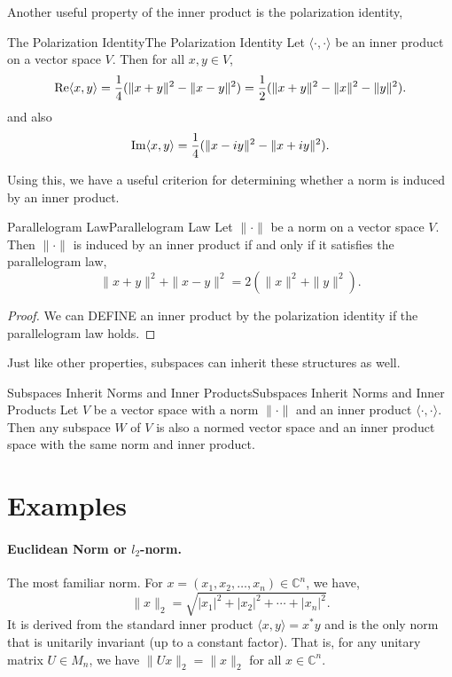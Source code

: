 \documentclass[../main.tex]{subfiles}
\begin{document}
Another useful property of the inner product is the polarization identity,
\begin{proposition}{The Polarization Identity}{The Polarization Identity}
  Let $\langle \cdot, \cdot \rangle$ be an inner product on a vector space $V$. Then for all $x, y \in V$,
  \begin{equation}
    \operatorname{Re}\langle x, y \rangle = \frac{1}{4}(\|x + y\|^2 - \|x - y\|^2) = \frac{1}{2}(\|x + y\|^2 - \|x\|^2 - \|y\|^2).
  \end{equation}
  and also
  \begin{equation*}
    \operatorname{Im}\langle x, y \rangle = \frac{1}{4}(\|x - iy\|^2 - \|x + iy\|^2).
  \end{equation*}
\end{proposition}

Using this, we have a useful criterion for determining whether a norm is induced by an inner product.
\begin{corollary}{Parallelogram Law}{Parallelogram Law}
  Let $\|\cdot\|$ be a norm on a vector space $V$. Then $\|\cdot\|$ is induced by an inner product if and only if it satisfies the parallelogram law,
  \begin{equation}
    \|x + y\|^2 + \|x - y\|^2 = 2(\|x\|^2 + \|y\|^2).
  \end{equation}
\end{corollary}
\begin{proof}
  We can DEFINE an inner product by the polarization identity if the parallelogram law holds.
\end{proof}

Just like other properties, subspaces can inherit these structures as well.
\begin{proposition}{Subspaces Inherit Norms and Inner Products}{Subspaces Inherit Norms and Inner Products}
  Let $V$ be a vector space with a norm $\|\cdot\|$ and an inner product $\langle \cdot, \cdot \rangle$. Then any subspace $W$ of $V$ is also a normed vector space and an inner product space with the same norm and inner product.
\end{proposition}

\section{Examples}

\paragraph{Euclidean Norm or $l_2$-norm.} The most familiar norm. For $x = (x_1, x_2, \ldots, x_n) \in \mathbb{C}^n$, we have,
\begin{equation*}
  \|x\|_2 = \sqrt{|x_1|^2 + |x_2|^2 + \cdots + |x_n|^2}.
\end{equation*}
It is derived from the standard inner product $\langle x, y \rangle = x^*y$ and is the only norm that is unitarily invariant (up to a constant factor). That is, for any unitary matrix $U \in M_n$, we have $\|Ux\|_2 = \|x\|_2$ for all $x \in \mathbb{C}^n$.
\end{document}
